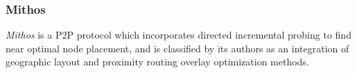 %
%
%
%
%
%
%

%
%
%

\subsubsection{Mithos}
\emph{Mithos} \cite{waldvogel_mythos_2003} is a P2P protocol which incorporates
directed incremental probing to find near optimal node placement, and is
classified by its authors as an integration of geographic layout and proximity
routing overlay optimization methods.

